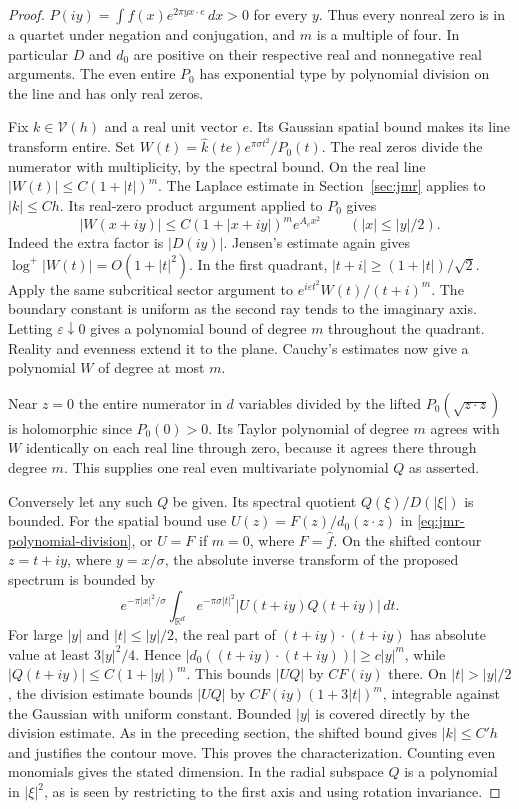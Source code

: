 \documentclass[11pt,a4paper]{article}
\numberwithin{equation}{section}
\begin{document}
\begin{proof}
$P(iy)=\int f(x)e^{2\pi y x\cdot e}\,dx>0$ for every $y$. Thus every nonreal zero is in a quartet under negation and conjugation, and $m$ is a multiple of four. In particular $D$ and $d_0$ are positive on their respective real and nonnegative real arguments. The even entire $P_0$ has exponential type by polynomial division on the line and has only real zeros.

Fix $k\in\mathcal V(h)$ and a real unit vector $e$. Its Gaussian spatial bound makes its line transform entire. Set $W(t)=\widehat k(te)e^{\pi\sigma t^2}/P_0(t)$. The real zeros divide the numerator with multiplicity, by the spectral bound. On the real line $|W(t)|\le C(1+|t|)^m$. The Laplace estimate in Section~\ref{sec:jmr} applies to $|k|\le Ch$. Its real-zero product argument applied to $P_0$ gives
\[
 |W(x+iy)|\le C(1+|x+iy|)^m e^{A_e x^2}
 \qquad(|x|\le |y|/2).
\]
Indeed the extra factor is $|D(iy)|$. Jensen's estimate again gives $\log^+|W(t)|=O(1+|t|^2)$. In the first quadrant, $|t+i|\ge (1+|t|)/\sqrt2$. Apply the same subcritical sector argument to $e^{i\varepsilon t^2}W(t)/(t+i)^m$. The boundary constant is uniform as the second ray tends to the imaginary axis. Letting $\varepsilon\downarrow0$ gives a polynomial bound of degree $m$ throughout the quadrant. Reality and evenness extend it to the plane. Cauchy's estimates now give a polynomial $W$ of degree at most $m$.

Near $z=0$ the entire numerator in $d$ variables divided by the lifted $P_0(\sqrt{z\cdot z})$ is holomorphic since $P_0(0)>0$. Its Taylor polynomial of degree $m$ agrees with $W$ identically on each real line through zero, because it agrees there through degree $m$. This supplies one real even multivariate polynomial $Q$ as asserted.

Conversely let any such $Q$ be given. Its spectral quotient $Q(\xi)/D(|\xi|)$ is bounded. For the spatial bound use $U(z)=F(z)/d_0(z\cdot z)$ in \eqref{eq:jmr-polynomial-division}, or $U=F$ if $m=0$, where $F=\widehat f$. On the shifted contour $z=t+iy$, where $y=x/\sigma$, the absolute inverse transform of the proposed spectrum is bounded by
\[
 e^{-\pi|x|^2/\sigma}\int_{\mathbb R^d}e^{-\pi\sigma |t|^2}|U(t+iy)Q(t+iy)|\,dt.
\]
For large $|y|$ and $|t|\le |y|/2$, the real part of $(t+iy)\cdot(t+iy)$ has absolute value at least $3|y|^2/4$. Hence $|d_0((t+iy)\cdot(t+iy))|\ge c |y|^m$, while $|Q(t+iy)|\le C(1+|y|)^m$. This bounds $|UQ|$ by $C F(iy)$ there. On $|t|>|y|/2$, the division estimate bounds $|UQ|$ by $C F(iy)(1+3|t|)^m$, integrable against the Gaussian with uniform constant. Bounded $|y|$ is covered directly by the division estimate. As in the preceding section, the shifted bound gives $|k|\le C'h$ and justifies the contour move. This proves the characterization. Counting even monomials gives the stated dimension. In the radial subspace $Q$ is a polynomial in $|\xi|^2$, as is seen by restricting to the first axis and using rotation invariance.


\end{proof}
\end{document}
